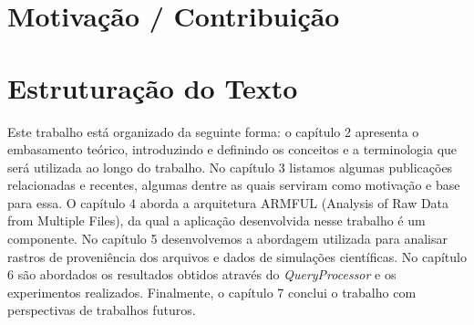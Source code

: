 


\section{Motivação / Contribuição} %

\section{Estruturação do Texto}


Este trabalho está organizado da seguinte forma:
o capítulo 2 apresenta o embasamento teórico, introduzindo e definindo os conceitos e a terminologia que será utilizada ao longo do trabalho.
No capítulo 3 listamos algumas publicações relacionadas e recentes, algumas dentre as quais serviram como motivação e base para essa.
O capítulo 4 aborda a arquitetura  ARMFUL (Analysis of Raw Data from Multiple Files), da qual a aplicação desenvolvida nesse trabalho é um componente.
No capítulo 5 desenvolvemos a abordagem utilizada para analisar rastros de proveniência dos arquivos e dados de simulações científicas.
No capítulo 6 são abordados os resultados obtidos através do \textit{QueryProcessor} e os experimentos realizados.
Finalmente, o capítulo 7 conclui o trabalho com perspectivas de trabalhos futuros.